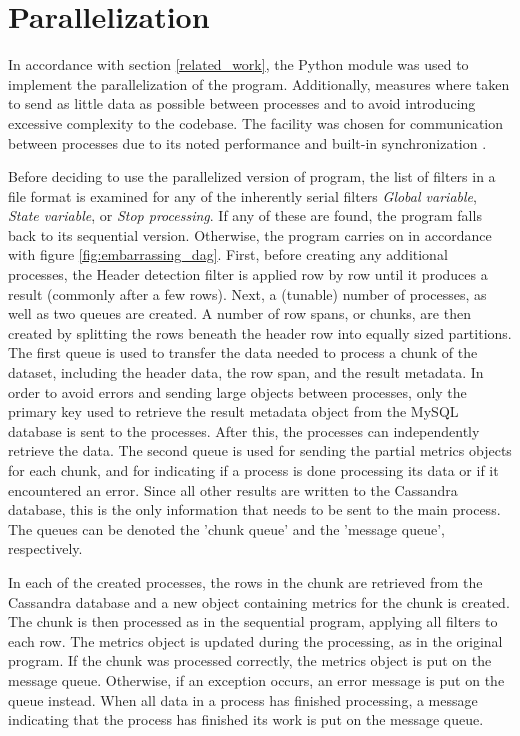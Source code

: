 \section{Parallelization}
In accordance with section \ref{related_work}, the Python  module was used to implement the parallelization of the program. Additionally, measures where taken to send as little
data as possible between processes and to avoid introducing excessive complexity to the codebase. The  facility was chosen for communication between processes due to its
noted performance and built-in synchronization \cite{singh_2013_parallel_padpwprfmm}.

Before deciding to use the parallelized version of program, the list of filters in a file format is examined for any of the inherently serial filters
\textit{Global variable}, \textit{State variable}, or \textit{Stop processing}. If any of these are found, the
program falls back to its sequential version. Otherwise, the program carries on in accordance with figure \ref{fig:embarrassing_dag}. First, before creating any additional processes, the Header detection filter
is applied row by row until it produces a result (commonly after a few rows). Next, a (tunable) number of processes, as well as two queues are created. A number of row spans, or chunks, are then created by splitting
the rows beneath the header row into equally sized partitions. The first queue is used to transfer the data needed to process a chunk of the dataset, including the header data, the row span, and the result metadata.
In order to avoid errors and sending large objects between processes, only the primary key used to retrieve the result metadata object from the MySQL database is sent to the processes.
After this, the processes can independently retrieve the data. The second queue is used for sending the partial metrics objects for each chunk, and for indicating if a process is done processing
its data or if it encountered an error. Since all other results are written to the Cassandra database, this is the only information that needs to be sent to the main process. The queues can be
denoted the 'chunk queue' and the 'message queue', respectively.

In each of the created processes, the rows in the chunk are retrieved from the Cassandra database and a new object containing metrics for the chunk is created. The chunk is then processed as in the sequential program,
applying all filters to each row. The metrics object is updated during the processing, as in the original program. If the chunk was processed correctly, the metrics object is put on the message queue. Otherwise,
if an exception occurs, an error message is put on the queue instead. When all data in a process has finished processing, a message indicating that the process has finished its work is put on the message queue.

